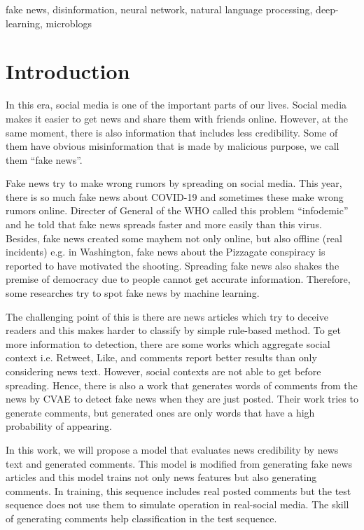 \documentclass[conference]{IEEEtran}
\begin{document}
\begin{IEEEkeywords}
fake news, disinformation, neural network, natural language processing, deep-learning, microblogs
\end{IEEEkeywords}

\section{Introduction}
In this era, social media is one of the important parts of our lives.
Social media makes it easier to get news and share them with friends online.
However, at the same moment, 
there is also information that includes less credibility.
Some of them have obvious misinformation that is made by malicious purpose,
we call them ``fake news''.

Fake news try to make wrong rumors by spreading on social media.
This year, there is so much fake news about COVID-19 and sometimes these make wrong rumors online.
Directer of General of the WHO called this problem ``infodemic'' and he told that fake news spreads faster and more easily than this virus\cite{ZAROCOSTAS2020676}. 
Besides, fake news created some mayhem not only online, but also offline (real incidents)
e.g. in Washington, fake news about the Pizzagate conspiracy is reported to have motivated the shooting\cite{agencies_2016}.
Spreading fake news also shakes the premise of democracy due to people cannot get accurate information.
Therefore, some researches try to spot fake news by machine learning.

The challenging point of this is there are news articles which try to deceive readers
and this makes harder to classify by simple rule-based method.
To get more information to detection,
there are some works which aggregate social context i.e. Retweet, Like, and comments
report better results than only considering news text\cite{Guo:2018:RDH:3269206.3271709}.
However, social contexts are not able to get before spreading.
Hence, there is also a work that generates words of comments from the news by CVAE to detect fake news when they are just posted\cite{ijcai2018-533}.
Their work tries to generate comments, but generated ones are only words that have a high probability of appearing.

In this work, we will propose a model that evaluates news credibility by news text and generated comments.
This model is modified from generating fake news articles\cite{NIPS2019_9106} and this model trains not only news features but also generating comments.
In training, this sequence includes real posted comments but the test sequence does not use them to simulate operation in real-social media.
The skill of generating comments help classification in the test sequence.
\end{document}
